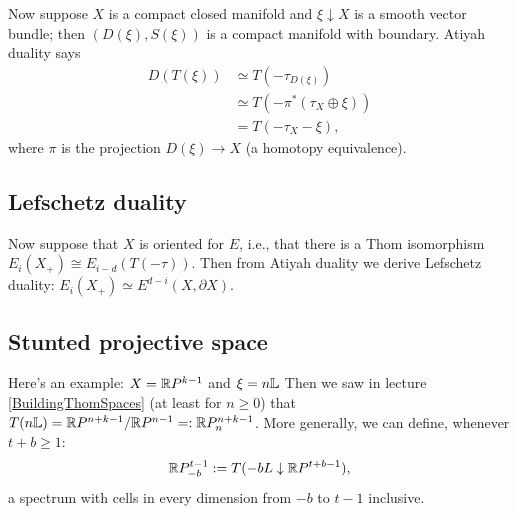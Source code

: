Now suppose $X$ is a compact closed manifold and $\xi \downarrow X$ is a smooth vector bundle; then $(D(\xi), S(\xi))$ is a compact manifold with boundary.  Atiyah duality says
\begin{align*}
D(T(\xi))
& \simeq T(-\tau_{D(\xi)}) \\
& \simeq T(-\pi^*(\tau_X \oplus \xi)) \\
& = T(-\tau_X - \xi),
\end{align*}
where $\pi$ is the projection $D(\xi) \to X$ (a homotopy equivalence).
\subsection*{Lefschetz duality}
Now suppose that $X$ is oriented for $E$, i.e., that there is a Thom isomorphism $E_i(X_+)\cong E_{i-d}(T(-\tau))$. Then from Atiyah duality we derive Lefschetz duality: $E_i (X_+) \simeq E^{d-i}(X, \partial X)$.
\subsection*{Stunted projective space}
Here's an example: $X = \mathbb{R} P^{k-1}$ and $\xi = n \mathbb{L}$ %
Then we saw in lecture \ref{BuildingThomSpaces} (at least for $n\geq0$) that $T(n \mathbb{L}) = \mathbb{R} P^{n+k-1} / \mathbb{R} P^{n-1} =: \mathbb{R} P^{n+k-1}_n$.
More generally, we can define, whenever $t+b\geq1$:
\[\mathbb{R} P^{t-1}_{-b}:= T(-bL\downarrow\mathbb{R} P^{t+b-1}),\]
a spectrum with cells in every dimension from $-b$ to $t-1$ inclusive.

